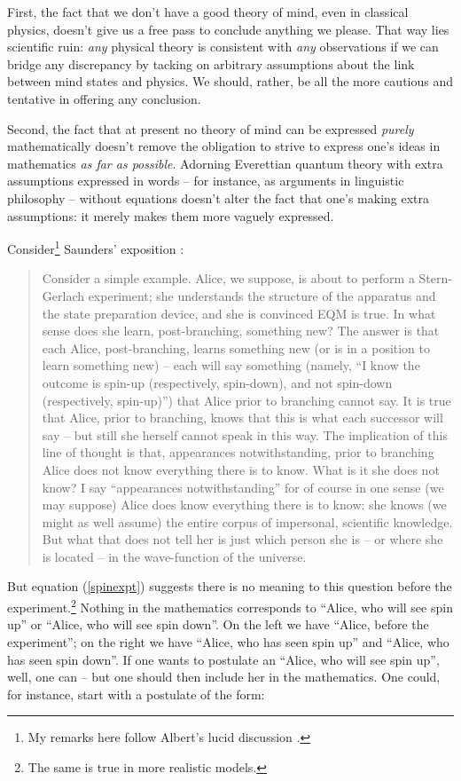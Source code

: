 \documentclass[aps,
pra,epsfig,12pt,nofootinbib]{revtex4}
\begin{document}
First, the fact that we don't 
have a good theory of mind, even in classical physics, doesn't give 
us a free pass to conclude anything we please.   That way lies 
scientific ruin: {\it any} physical theory is consistent with
{\it any} observations if we can bridge any discrepancy 
by tacking on arbitrary assumptions about the link between mind 
states and physics.   We should, rather, be 
all the more cautious and tentative in offering any conclusion.  

Second, the fact that at present no theory of mind can be expressed {\it purely}
mathematically doesn't remove the obligation to strive to express
one's ideas in mathematics {\it as far as possible}.   
Adorning Everettian quantum theory 
with extra assumptions expressed in words -- for instance, as arguments in
linguistic philosophy -- without equations doesn't
alter the fact that one's making extra assumptions: it merely makes 
them more vaguely expressed.  

Consider\footnote{My remarks here follow
Albert's lucid discussion \cite{albertvol}.}
Saunders' exposition \cite{saundersvol}:

\begin{quotation}
Consider a simple example. Alice, we suppose, is about
to perform a Stern-Gerlach experiment; she understands the structure of the
apparatus and the state preparation device, and she is convinced EQM is true.
In what sense does she learn, post-branching, something new? The answer is
that each Alice, post-branching, learns something new (or is in a position to
learn something new) -- each will say something (namely, ``I know the outcome
is spin-up (respectively, spin-down), and not spin-down 
(respectively, spin-up)'') that Alice prior to branching cannot say. 
It is true that Alice, prior to branching, 
knows that this is what each successor will say -- but 
still she herself cannot speak
in this way.
The implication of this line of thought is that, appearances notwithstanding,
prior to branching Alice does not know everything there is to know. What is it
she does not know? I say ``appearances notwithstanding'' for of course in one
sense (we may suppose) Alice does know everything there is to know: she knows
(we might as well assume) the entire corpus of impersonal, scientific knowledge.
But what that does not tell her is just which person she is -- 
or where she is located -- in the wave-function of the universe.
\end{quotation}

But equation (\ref{spinexpt}) suggests there is
no meaning to this question before the 
experiment.\footnote{The same is true in more realistic
models.}
Nothing in the mathematics corresponds to ``Alice, 
who will see spin up'' or ``Alice, who will
see spin down''.  On the left we have  
``Alice, before the experiment''; on the right we have 
``Alice, who has seen spin up'' and ``Alice, who has seen spin down''. 
If one wants to postulate an ``Alice, who will see spin up'', well, 
one can -- but one should then include her in 
the mathematics.
One could, for instance, start with a postulate of the form:
\end{document}
